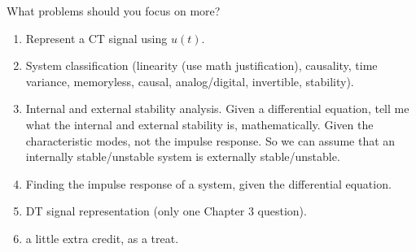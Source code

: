 \documentclass{article}
\begin{document}
What problems should you focus on more? 
\begin{enumerate}
	\item Represent a CT signal using \(u(t)\).
	\item System classification (linearity (use math justification), causality, time variance, memoryless, causal, analog/digital, invertible, stability).
	\item Internal and external stability analysis. Given a differential equation, tell me what the internal and external stability is, mathematically. Given the characteristic modes, not the impulse response. So we can assume that an internally stable/unstable system is externally stable/unstable.
	\item Finding the impulse response of a system, given the differential equation.
	\item DT signal representation (only one Chapter 3 question).
	\item a little extra credit, as a treat.
\end{enumerate}
\end{document}
